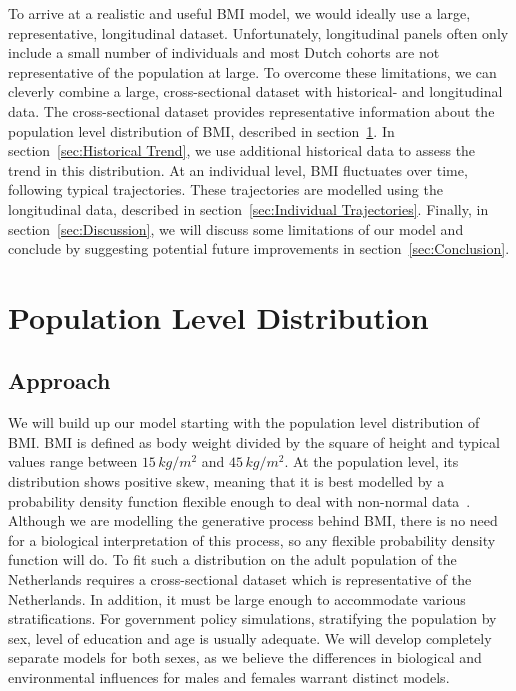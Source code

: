 \documentclass{imammb}
\numberwithin{equation}{section}
\begin{document}
To arrive at a realistic and useful BMI model, we would ideally use a large, representative, longitudinal dataset. Unfortunately, longitudinal panels often only include a small number of individuals and most Dutch cohorts are not representative of the population at large. To overcome these limitations, we can cleverly combine a large, cross-sectional dataset with historical- and longitudinal data. The cross-sectional dataset provides representative information about the population level distribution of BMI, described in section~\ref{sec:Population Level Distribution}. In section~\ref{sec:Historical Trend}, we use additional historical data to assess the trend in this distribution. At an individual level, BMI fluctuates over time, following typical trajectories. These trajectories are modelled using the longitudinal data, described in section~\ref{sec:Individual Trajectories}. Finally, in section~\ref{sec:Discussion}, we will discuss some limitations of our model and conclude by suggesting potential future improvements in section~\ref{sec:Conclusion}.

\section{Population Level Distribution}
\label{sec:Population Level Distribution}

\subsection{Approach}
\label{sec:Population Level Distribution/Approach}

We will build up our model starting with the population level distribution of BMI. BMI is defined as body weight divided by the square of height and typical values range between $15 \, kg / m^2$ and $45 \, kg / m^2$. At the population level, its distribution shows positive skew, meaning that it is best modelled by a probability density function flexible enough to deal with non-normal data~\citep{Majer2013}. Although we are modelling the generative process behind BMI, there is no need for a biological interpretation of this process, so any flexible probability density function will do. To fit such a distribution on the adult population of the Netherlands requires a cross-sectional dataset which is representative of the Netherlands. In addition, it must be large enough to accommodate various stratifications. For government policy simulations, stratifying the population by sex, level of education and age is usually adequate. We will develop completely separate models for both sexes, as we believe the differences in biological and environmental influences for males and females warrant distinct models.
\end{document}
